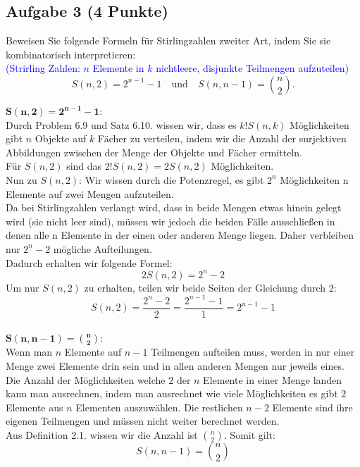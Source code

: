 \documentclass{article} %
\begin{document}
\subsection*{Aufgabe 3 (4 Punkte)}
Beweisen Sie folgende Formeln für Stirlingzahlen zweiter Art, indem Sie sie kombinatorisch interpretieren: \\
\textcolor{Blue}{(Strirling Zahlen: $n$ Elemente in $k$ nichtleere, disjunkte Teilmengen aufzuteilen)}
\[
S(n, 2) = 2^{n-1} - 1 \quad \text{und} \quad S(n, n - 1) = \binom{n}{2}.
\]
 \begin{mybox}
$ \mathbf{S(n, 2) = 2^{n-1} - 1}$:\\
 Durch Problem 6.9 und Satz 6.10. wissen wir, dass es $k!S(n, k)$ Möglichkeiten gibt $n$ Objekte auf $k$ Fächer zu verteilen, indem wir die Anzahl der surjektiven Abbildungen zwischen der Menge der Objekte und Fächer ermitteln. \\
 Für $S(n, 2)$ sind das $2!S(n, 2) = 2S(n, 2)$ Möglichkeiten. \\
Nun zu $S(n, 2)$: Wir wissen durch die Potenzregel, es gibt $2^n$ Möglichkeiten n Elemente auf zwei Mengen aufzuteilen. \\
 Da bei Stirlingzahlen verlangt wird, dass in beide Mengen etwas hinein gelegt wird (sie nicht leer sind), müssen wir jedoch die beiden Fälle ausschließen in denen alle n Elemente in der einen oder anderen Menge liegen. Daher verbleiben nur $2^n -2$ mögliche Aufteilungen.  \\
 Dadurch erhalten wir folgende Formel: 
  \[
 2S(n, 2) = 2^n -2
 \]
 Um nur $S(n, 2)$ zu erhalten, teilen wir beide Seiten der Gleichung durch $2$: 
 \[
 S(n, 2) = \frac{2^n -2}{2} = \frac{2^{n-1} -1}{1} = 2^{n-1} -1
 \]\\
 $\mathbf{S(n, n - 1) = \binom{n}{2}}$:\\
 Wenn man $n$ Elemente auf $n-1$ Teilmengen aufteilen muss, werden in nur einer Menge zwei Elemente drin sein und in allen anderen Mengen nur jeweils eines. Die Anzahl der Möglichkeiten welche $2$ der $n$ Elemente in einer Menge landen kann man ausrechnen, indem man ausrechnet wie viele Möglichkeiten es gibt $2$ Elemente aus $n$ Elementen auszuwählen. Die restlichen $n-2$ Elemente sind ihre eigenen Teilmengen und müssen nicht weiter berechnet werden. \\
 Aus Definition 2.1. wissen wir die Anzahl ist $\binom{n}{2}$. Somit gilt: 
 \[
 S(n, n - 1) = \binom{n}{2}
 \]
 \end{mybox}
\end{document}
